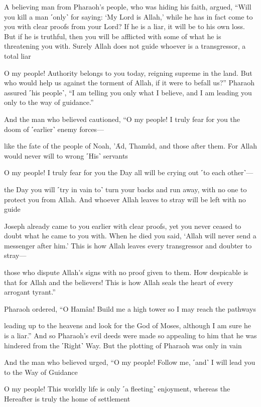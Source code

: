 A believing man from Pharaoh’s people, who was hiding his faith, argued, “Will you kill a man ˹only˺ for saying: ‘My Lord is Allah,’ while he has in fact come to you with clear proofs from your Lord? If he is a liar, it will be to his own loss. But if he is truthful, then you will be afflicted with some of what he is threatening you with. Surely Allah does not guide whoever is a transgressor, a total liar

O my people! Authority belongs to you today, reigning supreme in the land. But who would help us against the torment of Allah, if it were to befall us?” Pharaoh assured ˹his people˺, “I am telling you only what I believe, and I am leading you only to the way of guidance.”

And the man who believed cautioned, “O my people! I truly fear for you the doom of ˹earlier˺ enemy forces—

like the fate of the people of Noah, ’Ȃd, Thamûd, and those after them. For Allah would never will to wrong ˹His˺ servants

O my people! I truly fear for you the Day all will be crying out ˹to each other˺—

the Day you will ˹try in vain to˺ turn your backs and run away, with no one to protect you from Allah. And whoever Allah leaves to stray will be left with no guide

Joseph already came to you earlier with clear proofs, yet you never ceased to doubt what he came to you with. When he died you said, ‘Allah will never send a messenger after him.’ This is how Allah leaves every transgressor and doubter to stray—

those who dispute Allah’s signs with no proof given to them. How despicable is that for Allah and the believers! This is how Allah seals the heart of every arrogant tyrant.”

Pharaoh ordered, “O Hamân! Build me a high tower so I may reach the pathways

leading up to the heavens and look for the God of Moses, although I am sure he is a liar.” And so Pharaoh’s evil deeds were made so appealing to him that he was hindered from the ˹Right˺ Way. But the plotting of Pharaoh was only in vain

And the man who believed urged, “O my people! Follow me, ˹and˺ I will lead you to the Way of Guidance

O my people! This worldly life is only ˹a fleeting˺ enjoyment, whereas the Hereafter is truly the home of settlement

